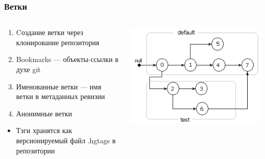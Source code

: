 \documentclass[xetex,mathserif,serif]{beamer}
\begin{document}
    \begin{frame}
        \frametitle{Ветки}
        \begin{columns}
            \begin{column}{0.6\textwidth}
                \begin{enumerate}
                    \item Cоздание ветки через клонирование репозитория
                    \item Bookmarks --- объекты-ссылки в духе git
                    \item Именованные ветки --- имя ветки в метаданных ревизии
                    \item Анонимные ветки
                \end{enumerate}
                \begin{itemize}
                    \item Тэги хранятся как версионируемый файл .hgtags в репозитории
                \end{itemize}
            \end{column}
            \begin{column}{0.4\textwidth}
                \includegraphics[width=\textwidth]{mercurialBranches.png}
            \end{column}
        \end{columns}
    \end{frame}
\end{document}
